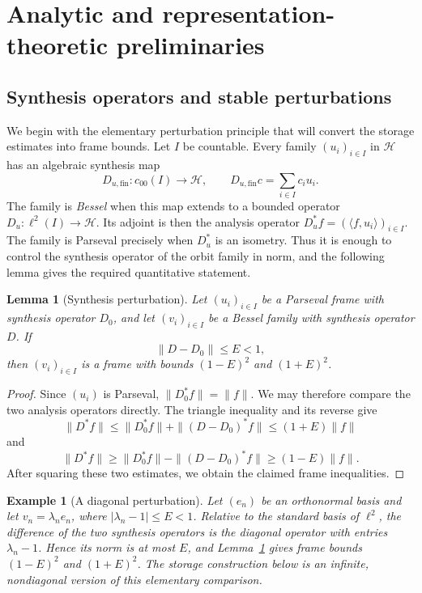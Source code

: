 \documentclass[10pt,a4paper]{amsart}
\numberwithin{equation}{section}
\newtheorem{lemma}[theorem]{Lemma}
\newtheorem{example}[theorem]{Example}
\newcommand{\cH}{\mathcal H}
\begin{document}
\section{Analytic and representation-theoretic preliminaries}
\label{sec:preliminaries}

\subsection{Synthesis operators and stable perturbations}

We begin with the elementary perturbation principle that will convert the
storage estimates into frame bounds.  Let $I$ be countable.  Every family
$(u_i)_{i\in I}$ in $\cH$ has an
algebraic synthesis map
\[
 D_{u,\mathrm{fin}}:c_{00}(I)\longrightarrow\cH,
 \qquad D_{u,\mathrm{fin}}c=\sum_{i\in I}c_i u_i.
\]
The family is \emph{Bessel} when this map extends to a bounded operator
$D_u:\ell^2(I)\to\cH$.  Its adjoint is then the analysis operator
$D_u^*f=(\langle f,u_i\rangle)_{i\in I}$.  The family is Parseval precisely
when $D_u^*$ is an isometry.  Thus it is enough to control the synthesis
operator of the orbit family in norm, and the following lemma gives the
required quantitative statement.

\begin{lemma}[Synthesis perturbation]
\label{lem:synthesis-perturbation}
Let $(u_i)_{i\in I}$ be a Parseval frame with synthesis operator $D_0$, and
let $(v_i)_{i\in I}$ be a Bessel family with synthesis operator $D$.  If
\begin{equation}\label{eq:synthesis-perturbation-hypothesis}
   \|D-D_0\|\leq E<1,
\end{equation}
then $(v_i)_{i\in I}$ is a frame with bounds $(1-E)^2$ and $(1+E)^2$.
\end{lemma}

\begin{proof}
Since $(u_i)$ is Parseval, $\|D_0^*f\|=\|f\|$.  We may therefore compare the
two analysis operators directly.  The triangle inequality and its reverse
give
\[
 \|D^*f\|
 \leq \|D_0^*f\|+\|(D-D_0)^*f\|
 \leq (1+E)\|f\|
\]
and
\[
 \|D^*f\|
 \geq \|D_0^*f\|-\|(D-D_0)^*f\|
 \geq (1-E)\|f\|.
\]
After squaring these two estimates, we obtain the claimed frame inequalities.
\end{proof}

\begin{example}[A diagonal perturbation]\label{ex:diagonal-perturbation}
Let $(e_n)$ be an orthonormal basis and let
$v_n=\lambda_ne_n$, where $|\lambda_n-1|\leq E<1$.  Relative to the standard
basis of $\ell^2$, the difference of the two synthesis operators is the
diagonal operator with entries $\lambda_n-1$.  Hence its norm is at most
$E$, and Lemma~\ref{lem:synthesis-perturbation} gives frame bounds
$(1-E)^2$ and $(1+E)^2$.  The storage construction below is an infinite,
nondiagonal version of this elementary comparison.
\end{example}
\end{document}
